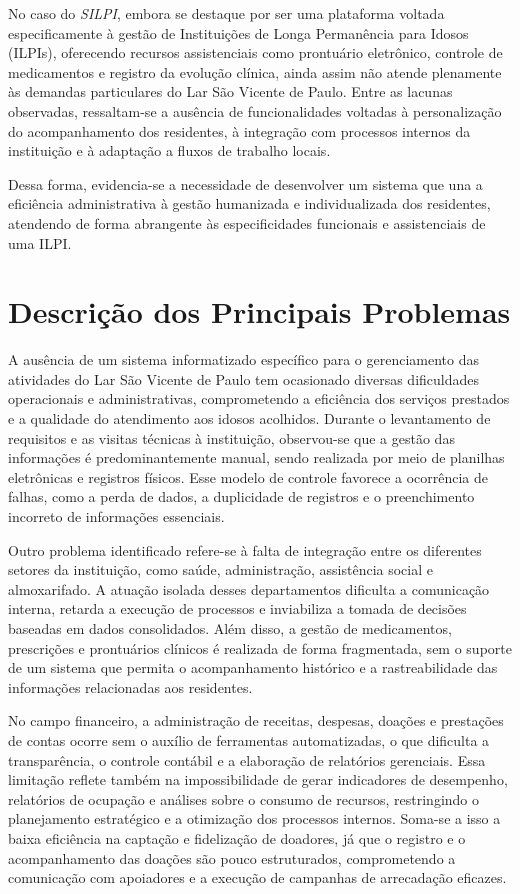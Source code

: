 No caso do \textit{SILPI}, embora se destaque por ser uma plataforma voltada especificamente à gestão de Instituições de Longa Permanência para Idosos (ILPIs), oferecendo recursos assistenciais como prontuário eletrônico, controle de medicamentos e registro da evolução clínica, ainda assim não atende plenamente às demandas particulares do Lar São Vicente de Paulo. Entre as lacunas observadas, ressaltam-se a ausência de funcionalidades voltadas à personalização do acompanhamento dos residentes, à integração com processos internos da instituição e à adaptação a fluxos de trabalho locais.  

Dessa forma, evidencia-se a necessidade de desenvolver um sistema que una a eficiência administrativa à gestão humanizada e individualizada dos residentes, atendendo de forma abrangente às especificidades funcionais e assistenciais de uma ILPI.

\section{Descrição dos Principais Problemas}

A ausência de um sistema informatizado específico para o gerenciamento das atividades do Lar São Vicente de Paulo tem ocasionado diversas dificuldades operacionais e administrativas, comprometendo a eficiência dos serviços prestados e a qualidade do atendimento aos idosos acolhidos. Durante o levantamento de requisitos e as visitas técnicas à instituição, observou-se que a gestão das informações é predominantemente manual, sendo realizada por meio de planilhas eletrônicas e registros físicos. Esse modelo de controle favorece a ocorrência de falhas, como a perda de dados, a duplicidade de registros e o preenchimento incorreto de informações essenciais.

Outro problema identificado refere-se à falta de integração entre os diferentes setores da instituição, como saúde, administração, assistência social e almoxarifado. A atuação isolada desses departamentos dificulta a comunicação interna, retarda a execução de processos e inviabiliza a tomada de decisões baseadas em dados consolidados. Além disso, a gestão de medicamentos, prescrições e prontuários clínicos é realizada de forma fragmentada, sem o suporte de um sistema que permita o acompanhamento histórico e a rastreabilidade das informações relacionadas aos residentes.

No campo financeiro, a administração de receitas, despesas, doações e prestações de contas ocorre sem o auxílio de ferramentas automatizadas, o que dificulta a transparência, o controle contábil e a elaboração de relatórios gerenciais. Essa limitação reflete também na impossibilidade de gerar indicadores de desempenho, relatórios de ocupação e análises sobre o consumo de recursos, restringindo o planejamento estratégico e a otimização dos processos internos. Soma-se a isso a baixa eficiência na captação e fidelização de doadores, já que o registro e o acompanhamento das doações são pouco estruturados, comprometendo a comunicação com apoiadores e a execução de campanhas de arrecadação eficazes.

